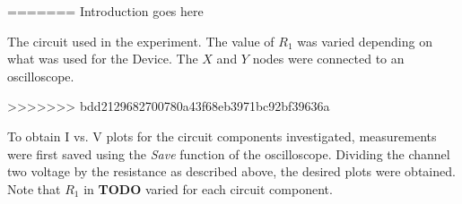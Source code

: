 \begin{paper}
=======
	Introduction goes here

{The circuit used in the experiment.
The value of $R_1$ was varied depending on what was used for the Device.
The $X$ and $Y$ nodes were connected to an oscilloscope.}

>>>>>>> bdd2129682700780a43f68eb3971bc92bf39636a
	
	To obtain I vs. V plots for the circuit components investigated, measurements were first saved using the \textit{Save} function of the oscilloscope. Dividing the channel two voltage by the resistance as described above, the desired plots were obtained.  Note that \( R_1 \) in \textbf{TODO} varied for each circuit component. 
	

\end{paper}
